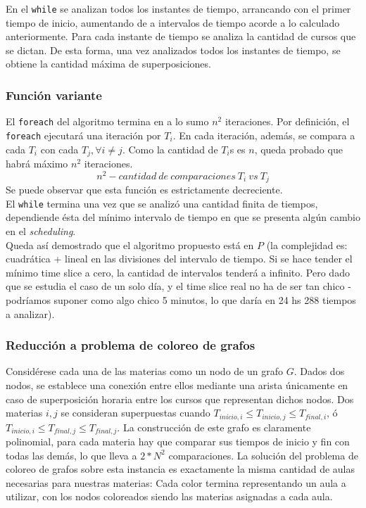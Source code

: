 \documentclass{article}
\begin{document}
En el \texttt{while} se analizan todos los instantes de tiempo, arrancando con el primer tiempo de inicio, aumentando de a intervalos de tiempo acorde a lo calculado anteriormente. Para cada instante de tiempo se analiza la cantidad de cursos que se dictan. De esta forma, una vez analizados todos los instantes de tiempo, se obtiene la cantidad máxima de superposiciones.

\subsubsection{Función variante}
El \texttt{foreach} del algoritmo termina en a lo sumo $n^2$ iteraciones. Por definición, el \texttt{foreach} ejecutará una iteración por $T_i$. En cada iteración, además, se compara a cada $T_i$ con cada $T_j, \forall i\neq j$. Como la cantidad de $T_i$s es $n$, queda probado que habrá máximo $n^2$ iteraciones.
\begin{equation}
    n^2 - cantidad\ de\ comparaciones\ T_i\ vs\ T_j
\end{equation}
Se puede observar que esta función es estrictamente decreciente.\\

El \texttt{while} termina una vez que se analizó una cantidad finita de tiempos, dependiende ésta del mínimo intervalo de tiempo en que se presenta algún cambio en el \textit{scheduling}.\\

Queda así demostrado que el algoritmo propuesto está en $P$ (la complejidad es: cuadrática + lineal en las divisiones del intervalo de tiempo. Si se hace tender el mínimo time slice a cero, la cantidad de intervalos tenderá a infinito. Pero dado que se estudia el caso de un solo día, y el time slice real no ha de ser tan chico - podríamos suponer como algo chico 5 minutos, lo que daría en 24 hs 288 tiempos a analizar).
\subsubsection{Reducción a problema de coloreo de grafos}
Considérese cada una de las materias como un nodo de un grafo $G$. Dados dos nodos, se establece una conexión entre ellos mediante una arista únicamente en caso de superposición horaria entre los cursos que representan dichos nodos. Dos materias $i, j$ se consideran superpuestas cuando $T_{inicio,i} \leq T_{inicio,j} \leq T_{final,i}$, ó $T_{inicio,i} \leq T_{final,j} \leq T_{final,j}$. La construcción de este grafo es claramente polinomial, para cada materia hay que comparar sus tiempos de inicio y fin con todas las demás, lo que lleva a $2*N^2$ comparaciones. La solución del problema de coloreo de grafos sobre esta instancia es exactamente la misma cantidad de aulas necesarias para nuestras materias: Cada color termina representando un aula a utilizar, con los nodos coloreados siendo las materias asignadas a cada aula.
\end{document}
